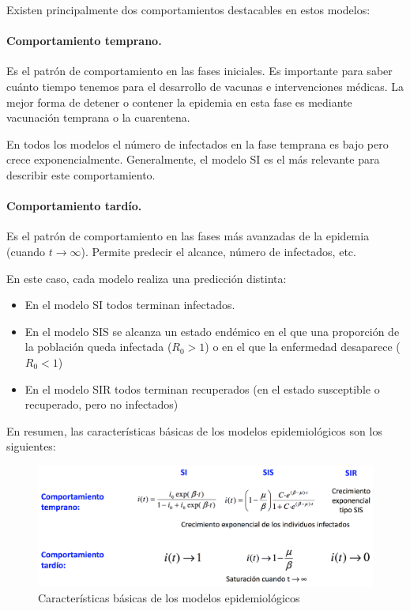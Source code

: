 \documentclass[]{article}
\begin{document}
Existen principalmente dos comportamientos destacables en estos modelos:

\paragraph*{Comportamiento temprano.}\label{comportamiento-temprano.}

Es el patrón de comportamiento en las fases iniciales. Es importante
para saber cuánto tiempo tenemos para el desarrollo de vacunas e
intervenciones médicas. La mejor forma de detener o contener la epidemia
en esta fase es mediante vacunación temprana o la cuarentena.

En todos los modelos el número de infectados en la fase temprana es bajo
pero crece exponencialmente. Generalmente, el modelo SI es el más
relevante para describir este comportamiento.

\paragraph*{Comportamiento tardío.}\label{comportamiento-tarduxedo.}

Es el patrón de comportamiento en las fases más avanzadas de la epidemia
(cuando \(t \to \infty\)). Permite predecir el alcance, número de
infectados, etc.

En este caso, cada modelo realiza una predicción distinta:

\begin{itemize}
\itemsep1pt\parskip0pt
\item
  En el modelo SI todos terminan infectados.
\item
  En el modelo SIS se alcanza un estado endémico en el que una
  proporción de la población queda infectada (\(R_0>1\)) o en el que la
  enfermedad desaparece (\(R_0<1\))
\item
  En el modelo SIR todos terminan recuperados (en el estado susceptible
  o recuperado, pero no infectados)
\end{itemize}

En resumen, las características básicas de los modelos epidemiológicos
son los siguientes:

\begin{figure}[htbp]
\centering
\includegraphics{../images/tema08/resumenModelos.png}
\caption{Características básicas de los modelos epidemiológicos}
\end{figure}
\end{document}
